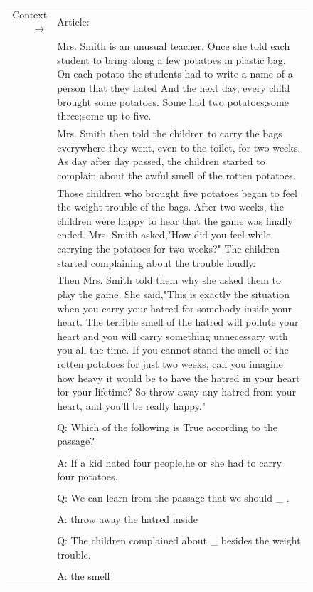 \documentclass{article}
\begin{document}
\begin{figure} { \tt \footnotesize \begin{tabularx}{\linewidth}{r X} \toprule Context $\to$ & Article: \\ 
 & Mrs. Smith is an unusual teacher. Once she told each student to bring along a few potatoes in plastic bag. On each potato the students had to write a name of a person that they hated And the next day, every child brought some potatoes. Some had two potatoes;some three;some up to five. \\ 
 & Mrs. Smith then told the children to carry the bags everywhere they went, even to the toilet, for two weeks. As day after day passed, the children started to complain about the awful smell of the rotten potatoes. \\ 
 & Those children who brought five potatoes began to feel the weight trouble of the bags. After two weeks, the children were happy to hear that the game was finally ended. Mrs. Smith asked,"How did you feel while carrying the potatoes for two weeks?" The children started complaining about the trouble loudly. \\ 
 & Then Mrs. Smith told them why she asked them to play the game. She said,"This is exactly the situation when you carry your hatred for somebody inside your heart. The terrible smell of the hatred will pollute your heart and you will carry something unnecessary with you all the time. If you cannot stand the smell of the rotten potatoes for just two weeks, can you imagine how heavy it would be to have the hatred in your heart for your lifetime? So throw away any hatred from your heart, and you'll be really happy." \\ 
 &  \\ 
 & Q: Which of the following is True according to the passage? \\ 
 &  \\ 
 & A: If a kid hated four people,he or she had to carry four potatoes. \\ 
 &  \\ 
 & Q: We can learn from the passage that we should  \_  . \\ 
 &  \\ 
 & A: throw away the hatred inside \\ 
 &  \\ 
 & Q: The children complained about  \_  besides the weight trouble. \\ 
 &  \\ 
 & A: the smell \\ 

\end{tabularx}}
\end{figure}
\end{document}
